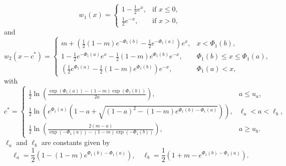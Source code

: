 \documentclass[11pt]{article}
\theoremstyle{definition}
\numberwithin{equation}{section}
\numberwithin{thm}{section}
\renewcommand{\a}{a}
\renewcommand{\b}{b}
\newcommand{\m}{m}
\newcommand{\mtwo}{1}
\begin{document}
\begin{equation} \label{w1laplace}
w_1(x) =   \begin{cases} 
1 - \frac{1}{2} e^{x}, & \text{if } x \leq 0, \\
\frac{1}{2} e^{-x}, & \text{if } x > 0,
\end{cases}
\end{equation}
and
\begin{equation} \label{w2laplace}
w_2(x-c^*) = \begin{cases}
\m + \left( \frac{1}{2}(\mtwo-\m)e^{-\Phi_1(\b)} - \frac{1}{2} e^{-\Phi_1(\a)} \right) e^x, & x < \Phi_1(\b), \\
\mtwo - \frac{1}{2} e^{-\Phi_1(\a)} e^x - \frac{1}{2} (\mtwo-\m) e^{\Phi_1(\b)}   e^{-x}, & \Phi_1(\b) \leq x \leq \Phi_1(\a), \\
\left( \frac{1}{2}e^{\Phi_1(\a)} - \frac{1}{2}(\mtwo-\m) e^{\Phi_1(\b)} \right) e^{-x}, & \Phi_1(\a) < x, 
\end{cases} \end{equation}
with
\begin{equation} \label{laplacecstar}
c^* = \begin{cases}
\frac{1}{2} \ln \left( \frac{\exp(\Phi_1(\a)) -(\mtwo-\m)\exp(\Phi_1(\b))}{2\a} \right), & \a \leq u_a, \\
\frac{1}{2} \ln \left( e^{\Phi_1(\a)} \left( \mtwo - \a + \sqrt{(\mtwo-\a)^2-(\mtwo-\m)e^{\Phi_1(\b)-\Phi_1(\a)}}\right)\right), & \ell_a < \a < \ell_b, \\
\frac{1}{2} \ln \left( \frac{2(\m-\a)}{\exp(-\Phi_1(\a))-(\mtwo-\m)\exp(-\Phi_1(\b))}\right), & \a \geq u_b.
\end{cases}
\end{equation}
$\ell_a$ and $\ell_b$ are constants given by
\begin{equation}
\ell_a = \frac{1}{2}\left(1 - (\mtwo-\m) e^{\Phi_1(\b)-\Phi_1(\a)} \right), \quad 
\ell_b = \frac{1}{2} \left( 1+\m- e^{\Phi_1(\b)-\Phi_1(\a)} \right).
\end{equation}
\end{document}
